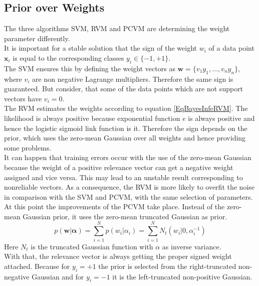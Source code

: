 \subsection{Prior over Weights}\label{PcSecWeights}
The three algorithms \acs{SVM}, \acs{RVM} and \acs{PCVM} are determining the weight parameter differently.\\
It is important for a stable solution that the sign of the weight $w_i$ of a data point $\mathbf{x}_i$ is equal to the corresponding classes $y_i \in\{-1,+1\}$.\cite{Chen.2009}\\
The \ac{SVM} ensures this by defining the weight vectors as $\mathbf{w} = \{v_1y_1,\dots,v_ny_n\}$, where $v_i$ are non negative Lagrange multipliers.
Therefore the same sign is guaranteed.\cite{Chen.2009}
But consider, that some of the data points which are not support vectors have $v_i=0$.\cite[p. 330]{Bishop.2009} \\
The \ac{RVM} estimates the weights according to equation \eqref{EqBayesInfeRVM}.
The likelihood is always positive because exponential function $e$ is always positive \cite[p. 355]{Hartmann.2015} and hence the logistic sigmoid link function is it.
Therefore the sign depends on the prior, which uses the zero-mean Gaussian over all weights and hence providing some problems.\\
It can happen that training errors occur with the use of the zero-mean Gaussian because the weight of a positive relevance vector can get a negative weight assigned and vice versa.
This may lead to an unstable result corresponding to nonreliable vectors.
As a consequence, the \acs{RVM} is more likely to overfit the noise in comparison with the \acs{SVM} and \acs{PCVM}, with the same selection of parameters.\cite{Chen.2009}\\
At this point the improvements of the \acs{PCVM} take place. 
Instead of the zero-mean Gaussian prior, it uses the zero-mean truncated Gaussian as prior. \cite{Chen.2009}
\begin{equation}\label{EqPcvmNtPrior}
	p(\mathbf{w} \vert \boldsymbol{\alpha}) = \sum_{i=1}^{N}p(w_i \vert \alpha_i) = \sum_{i=1}^{N}N_t(w_i \vert 0,\alpha_i^{-1})
\end{equation}
Here $N_t$ is the truncated Gaussian function with $\alpha$ as inverse variance.\\
With that, the relevance vector is always getting the proper signed weight attached.
Because for $y_i=+1$ the prior is selected from the right-truncated non-negative Gaussian and for $y_i=-1$ it is the left-truncated non-positive Gaussian.\cite{Chen.2009}\\
